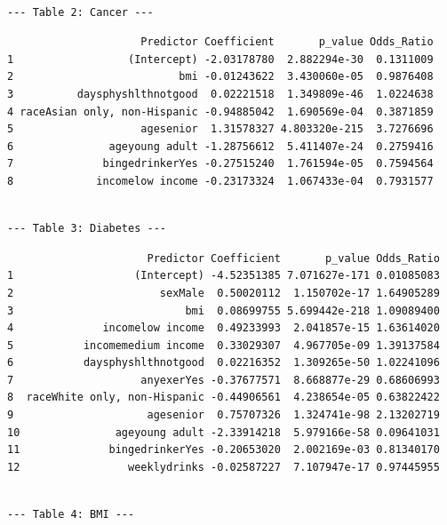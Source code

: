 \documentclass[
  10pt,
  letterpaper,
  DIV=11,
  numbers=noendperiod]{scrartcl}
\begin{document}
\begin{verbatim}

--- Table 2: Cancer ---
\end{verbatim}

\begin{verbatim}
                     Predictor Coefficient       p_value Odds_Ratio
1                  (Intercept) -2.03178780  2.882294e-30  0.1311009
2                          bmi -0.01243622  3.430060e-05  0.9876408
3          daysphyshlthnotgood  0.02221518  1.349809e-46  1.0224638
4 raceAsian only, non-Hispanic -0.94885042  1.690569e-04  0.3871859
5                    agesenior  1.31578327 4.803320e-215  3.7276696
6               ageyoung adult -1.28756612  5.411407e-24  0.2759416
7              bingedrinkerYes -0.27515240  1.761594e-05  0.7594564
8             incomelow income -0.23173324  1.067433e-04  0.7931577
\end{verbatim}

\begin{verbatim}

--- Table 3: Diabetes ---
\end{verbatim}

\begin{verbatim}
                      Predictor Coefficient       p_value Odds_Ratio
1                   (Intercept) -4.52351385 7.071627e-171 0.01085083
2                       sexMale  0.50020112  1.150702e-17 1.64905289
3                           bmi  0.08699755 5.699442e-218 1.09089400
4              incomelow income  0.49233993  2.041857e-15 1.63614020
5           incomemedium income  0.33029307  4.967705e-09 1.39137584
6           daysphyshlthnotgood  0.02216352  1.309265e-50 1.02241096
7                    anyexerYes -0.37677571  8.668877e-29 0.68606993
8  raceWhite only, non-Hispanic -0.44906561  4.238654e-05 0.63822422
9                     agesenior  0.75707326  1.324741e-98 2.13202719
10               ageyoung adult -2.33914218  5.979166e-58 0.09641031
11              bingedrinkerYes -0.20653020  2.002169e-03 0.81340170
12                 weeklydrinks -0.02587227  7.107947e-17 0.97445955
\end{verbatim}

\begin{verbatim}

--- Table 4: BMI ---
\end{verbatim}
\end{document}
